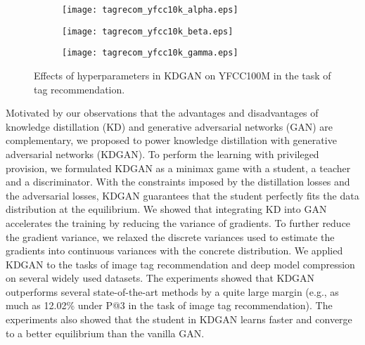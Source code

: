 \documentclass{article}
\begin{document}
\begin{figure}[tbp]
\centering
\setlength{\abovecaptionskip}{4pt plus 0pt minus 0pt}
\begin{subfigure}{.33\textwidth}
 \centering
 \texttt{[image: tagrecom\_yfcc10k\_alpha.eps]}
\end{subfigure}
\hspace*{-0.4em} %
\begin{subfigure}{.33\textwidth}
 \centering
 \texttt{[image: tagrecom\_yfcc10k\_beta.eps]}
\end{subfigure}
\hspace*{-0.4em} %
\begin{subfigure}{.33\textwidth}
 \centering
 \texttt{[image: tagrecom\_yfcc10k\_gamma.eps]}
\end{subfigure}
\caption{ Effects of hyperparameters in KDGAN on YFCC100M in the task of tag recommendation. }
\label{fig:image tag recommendation tuning}
\end{figure}

Motivated by our observations that the advantages and disadvantages of knowledge distillation (KD) and generative adversarial networks (GAN) are complementary, we proposed to power knowledge distillation with generative adversarial networks (KDGAN).
To perform the learning with privileged provision, we formulated KDGAN as a minimax game with a student, a teacher and a discriminator.
With the constraints imposed by the distillation losses and the adversarial losses, KDGAN guarantees that the student perfectly fits the data distribution at the equilibrium.
We showed that integrating KD into GAN accelerates the training by reducing the variance of gradients.
To further reduce the gradient variance, we relaxed the discrete variances used to estimate the gradients into continuous variances with the concrete distribution.
We applied KDGAN to the tasks of image tag recommendation and deep model compression on several widely used datasets.
The experiments showed that KDGAN outperforms several state-of-the-art methods by a quite large margin (e.g., as much as 12.02\% under P@3 in the task of image tag recommendation).
The experiments also showed that the student in KDGAN learns faster and converge to a better equilibrium than the vanilla GAN.


{
\scriptsize
% 


}


\appendix
\end{document}
